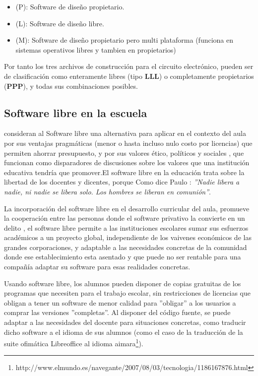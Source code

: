 \begin{itemize}
   \item (P): Software de diseño propietario.
   \item (L): Software de diseño libre.
   \item (M): Software de diseño propietario pero multi plataforma (funciona en sistemas operativos libres y tambien en propietarios)
 \end{itemize} 

Por tanto los tres archivos de construcción para el circuito electrónico, pueden ser de clasificación como enteramente libres (tipo \textbf{LLL}) o completamente propietarios (\textbf{PPP}), y todas sus combinaciones posibles.


\subsection{Software libre en la escuela}

\citet{adell_software_2007} consideran al Software libre una alternativa para aplicar en el contexto del aula por sus ventajas pragmáticas (menor o hasta incluso nulo costo por licencias) que permiten ahorrar presupuesto, y por sus valores ético, políticos y sociales \citep{hart_open_2003}, que funcionan como disparadores de discusiones sobre los valores que una institución educativa tendría que promover.El software libre en la educación trata sobre la libertad de los docentes y dicentes, porque Como dice Paulo \citet{freire_pedagogioprimido._2015}: \textit{''Nadie libera a nadie, ni nadie se libera solo. Los hombres se liberan en comunión''}.

La incorporación del software libre en el desarrollo curricular del aula, promueve la cooperación entre las personas donde el software privativo la convierte en un delito \citep{adell_software_2007}, el software libre permite a las instituciones escolares sumar sus esfuerzos académicos a un proyecto global, independiente de los vaivenes económicos de las grandes corporaciones, y adaptable a las necesidades concretas de la comunidad donde ese establecimiento esta asentado y que puede no ser rentable para una compañía adaptar su software para esas realidades concretas.

Usando software libre, los alumnos pueden disponer de copias gratuitas de los programas que necesiten para el trabajo escolar, sin restricciones de licencias que obligan a tener un software de menor calidad para ''obligar'' a los usuarios a comprar las versiones ''completas''. Al disponer del código fuente, se puede adaptar a las necesidades del docente para situaciones concretas, como traducir dicho software a el idioma de sus alumnos (como el caso de la traducción de la suite ofimática Libreoffice al idioma aimara\footnote{http://www.elmundo.es/navegante/2007/08/03/tecnologia/1186167876.html}). 

